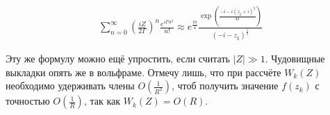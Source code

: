 \documentclass[a4paper, 12pt]{article}
\begin{document}
\begin{equation}
\begin{aligned}
    \sum\limits_{n=0}^{\infty}\left(\frac{iZ}{2\Gamma}\right)^n  \frac{e^{i\Gamma n^2}}{n!} \approx 
    e^{\frac{i\pi}{4}} \frac{\exp\left(\frac{-i-i(z_{\bar k}+i)^2}{4\Gamma}\right)}{(-i-z_{\bar k})^{\frac{1}{2}}}
\end{aligned}
\end{equation}

Эту же формулу можно ещё упростить, если считать $|Z|\gg 1$. Чудовищные выкладки опять же в вольфраме. Отмечу лишь, что при рассчёте $W_k(Z)$ необходимо удерживать члены $O\left(\frac{1}{R^2}\right)$, чтоб получить значение $f(z_k)$ с точностью $O\left(\frac{1}{R}\right)$, так как $W_k(Z) = O(R)$.
\end{document}
